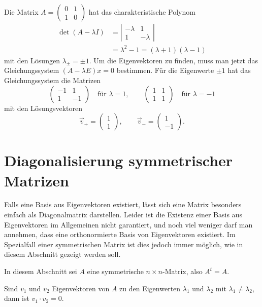 \begin{beispiel}
Die Matrix $A=\begin{pmatrix}0&1\\1&0\end{pmatrix}$ hat das 
charakteristische Polynom
\begin{align*}
\det(A-\lambda I)&=\left|\begin{matrix}-\lambda&1\\1&-\lambda\end{matrix}\right|\\
&=\lambda^2-1=(\lambda+1)(\lambda-1)
\end{align*}
mit den Lösungen $\lambda_\pm=\pm1$.
Um die Eigenvektoren zu finden, muss
man jetzt das Gleichungssystem $(A-\lambda E)x=0$ bestimmen.
Für die Eigenwerte $\pm1$ hat das Gleichungssystem die Matrizen
\[
\begin{pmatrix}
-1&1\\1&-1
\end{pmatrix}\quad \text{für $\lambda=1$},\qquad
\begin{pmatrix}
1&1\\1&1
\end{pmatrix}\quad\text{für $\lambda=-1$}
\]
mit den Lösungsvektoren 
\[
\vec v_+=\begin{pmatrix}1\\1\end{pmatrix},
\qquad
\vec v_-=\begin{pmatrix}1\\-1\end{pmatrix}.
\]
\end{beispiel}

\section{Diagonalisierung symmetrischer Matrizen\label{section-diag-sym}}
Falls eine Basis aus Eigenvektoren existiert, lässt sich eine Matrix
besonders einfach als Diagonalmatrix darstellen.
Leider ist die Existenz
einer Basis aus Eigenvektoren im Allgemeinen nicht garantiert, und noch
viel weniger darf man annehmen, dass eine orthonormierte Basis
von Eigenvektoren existiert.
Im Spezialfall einer symmetrischen Matrix
ist dies jedoch immer möglich, wie in diesem Abschnitt gezeigt werden
soll.

In diesem Abschnitt sei $A$ eine symmetrische $n\times n$-Matrix,
also  $A^t=A$.

\begin{hilfssatz}
Sind $v_1$ und $v_2$ Eigenvektoren von $A$ zu den Eigenwerten 
$\lambda_1$ und $\lambda_2$ mit $\lambda_1\ne \lambda_2$, dann
ist $v_1\cdot v_2=0$.
\end{hilfssatz}

